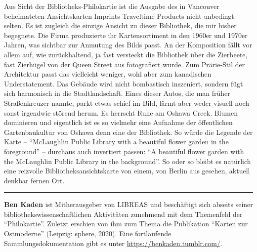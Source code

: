 \documentclass[a4paper,
fontsize=11pt,
oneside,
numbers=noperiodatend,
parskip=half-,
bibliography=totoc,
final
]{scrartcl}
\begin{document}
Aus Sicht der Bibliotheks-Philokartie ist die Ausgabe des in Vancouver
beheimateten Ansichts\-karten-Imprints Traveltime Products nicht unbedingt
selten. Es ist zugleich die einzige Ansicht zu dieser Bibliothek, die
mir bisher begegnete. Die Firma produzierte ihr Kartensortiment in den
1960er und 1970er Jahren, was sichtbar zur Anmutung des Bilds passt. An
der Komposition fällt vor allem auf, wie zurückhaltend, ja fast
versteckt die Bibliothek über die Zierbeete, fast Zierhügel von der
Queen Street aus fotografiert wurde. Zum Prärie-Stil der Architektur
passt das vielleicht weniger, wohl aber zum kanadischen Understatement.
Das Gebäude wird nicht bombastisch inszeniert, sondern fügt sich
harmonisch in die Stadtlandschaft. Eines dieser Autos, die man früher
Straßenkreuzer nannte, parkt etwas schief im Bild, lärmt aber weder
visuell noch sonst irgendwie störend herum. Es herrscht Ruhe am Oshawa
Creek. Blumen dominieren und eigentlich ist es so vielmehr eine Aufnahme
der öffentlichen Gartenbaukultur von Oshawa denn eine der Bibliothek. So
würde die Legende der Karte -- \enquote{McLaughlin Public Library with a
beautiful flower garden in the foreground} -- durchaus auch invertiert
passen: \enquote{A beautiful flower garden with the McLaughlin Public
Library in the background}. So oder so bleibt es natürlich eine
reizvolle Bibliotheksansichtskarte von einem, von Berlin aus gesehen,
aktuell denkbar fernen Ort.

\begin{center}\rule{0.5\linewidth}{0.5pt}\end{center}

\textbf{Ben Kaden} ist Mitherausgeber von LIBREAS und beschäftigt sich
abseits seiner bibliothekswissenschaftlichen Aktivitäten zunehmend mit
dem Themenfeld der ``Philokartie''. Zuletzt erschien von ihm zum Thema
die Publikation ``Karten zur Ostmoderne'' (Leipzig: sphere, 2020). Eine
fortlaufende Sammlungsdokumentation gibt es unter
\url{https://benkaden.tumblr.com/}.
\end{document}
